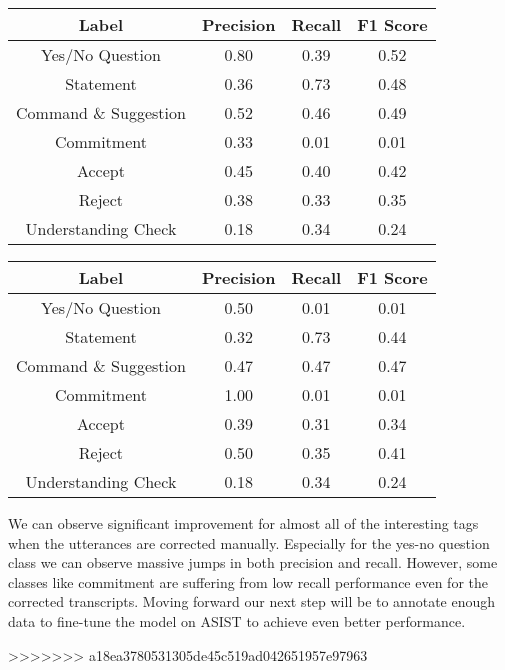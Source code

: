 \begin{center}
\begin{tabular}{||c c c c||}
 \hline
 Label & Precision & Recall & F1 Score\\ [0.5ex]
 \hline\hline
 Yes/No Question & 0.80 & 0.39  & 0.52\\
 \hline
 Statement & 0.36 & 0.73 & 0.48\\
 \hline
 Command \& Suggestion & 0.52 & 0.46 & 0.49\\
 \hline
 Commitment & 0.33 & 0.01 & 0.01\\
 \hline
 Accept & 0.45 & 0.40 &  0.42 \\
 \hline
  Reject & 0.38 & 0.33 & 0.35\\
 \hline
  Understanding Check & 0.18 & 0.34 & 0.24\\
 \hline
\end{tabular}
\end{center}

\begin{center}
\begin{tabular}{||c c c c||}
 \hline
 Label & Precision & Recall & F1 Score\\ [0.5ex]
 \hline\hline
 Yes/No Question & 0.50 & 0.01 & 0.01\\
 \hline
 Statement & 0.32 & 0.73 & 0.44\\
 \hline
 Command \& Suggestion & 0.47 & 0.47 & 0.47\\
 \hline
 Commitment & 1.00 & 0.01 & 0.01\\
 \hline
 Accept & 0.39 & 0.31 &  0.34 \\
 \hline
  Reject & 0.50 & 0.35 & 0.41\\
 \hline
  Understanding Check & 0.18 & 0.34 & 0.24\\
 \hline
\end{tabular}
\end{center}

We can observe significant improvement for almost all of the interesting tags when the
utterances are corrected manually. Especially for the yes-no question class we can 
observe massive jumps in both precision and recall. However, some classes like commitment
are suffering from low recall performance even for the corrected transcripts. Moving forward
our next step will be to annotate enough data to fine-tune the model on ASIST to achieve
even better performance.

>>>>>>> a18ea3780531305de45c519ad042651957e97963
